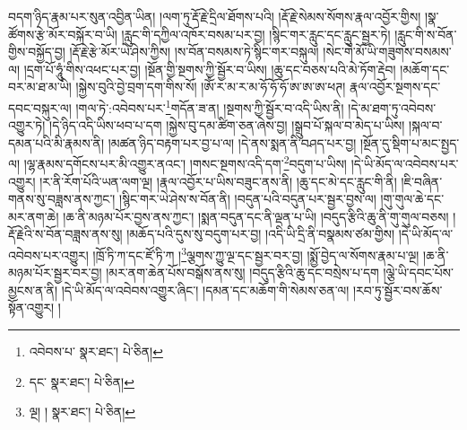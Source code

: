 བདག་ཉིད་རྣམ་པར་སུན་འབྱིན་ཡིན། །ལག་ཏུ་རྡོ་རྗེ་དྲིལ་ཐོགས་པའི། །རྡོ་རྗེ་སེམས་སོགས་རྣལ་འབྱོར་གྱིས། །སྣ་ཚོགས་རྩེ་མོར་བསྐོར་བ་ཡི། །རླུང་གི་དཀྱིལ་འཁོར་བསམ་པར་བྱ། །སྙིང་གར་རླུང་དང་རླུང་སྦྱར་ཏེ། །རླུང་གི་ས་བོན་གྱིས་བསྐྱོད་བྱ། །རྡོ་རྗེ་རྩེ་མོར་ཡེ་ཤེས་ཀྱིས། །ས་བོན་བསམས་ཏེ་སྙིང་གར་བསྐུལ། །སེང་གེ་མོ་ཡི་གཟུགས་བསམས་ལ། །དྲག་པོ་ཧཱུཾ་གིས་འཕང་པར་བྱ། །སྔོན་གྱི་སྔགས་ཀྱི་སྦྱོར་བ་ཡིས། །ཆུ་དང་བཅས་པའི་མེ་ཏོག་རྡེབ། །མཆོག་དང་བར་མ་ཐ་མ་ཡི། །སྐྱེས་བུའི་བྱེ་བྲག་དག་གིས་སོ། །ཨོཾ་ར་མ་ར་མ་ཧོ་ཧོ་ཧོ་ཨ་ཨ་ཨ་ཕཊ། རྣལ་འབྱོར་སྔགས་དང་དབང་བསྐུར་ལ། །གལ་ཏེ་:འབེབས་པར་\footnote{འབེབས་པ་  སྣར་ཐང་།  པེ་ཅིན། }གདོན་ཟ་ན། །སྔགས་ཀྱི་སྦྱོར་བ་འདི་ཡིས་ནི། །དེ་མ་ཐག་ཏུ་འབེབས་འགྱུར་ཏེ། །དེ་ཉིད་འདི་ཡིས་ཕབ་པ་དག །སྐྱེས་བུ་དམ་ཚིག་ཅན་ཞེས་བྱ། །སྒྲུབ་པོ་སྐལ་བ་མེད་པ་ཡིས། །སྐལ་བ་དམན་པའི་མི་རྣམས་ནི། །མཚན་ཉིད་བརྟག་པར་བྱ་པ་ལ། །དེ་ནས་སྨན་ནི་བཤད་པར་བྱ། །སྔོན་དུ་སྡིག་པ་མང་སྤྱད་ལ། །ལྷ་རྣམས་དགོངས་པར་མི་འགྱུར་ནའང་། །གསང་སྔགས་འདི་དག་\footnote{དང་  སྣར་ཐང་།  པེ་ཅིན། }བདུག་པ་ཡིས། །དེ་ཡི་མོད་ལ་འབེབས་པར་འགྱུར། །ར་ནི་རོག་པོའི་ཡན་ལག་ལྔ། །རྣལ་འབྱོར་པ་ཡིས་བཟུང་ནས་ནི། །ཆུ་དང་མེ་དང་རླུང་གི་ནི། །ཇི་བཞིན་གནས་སུ་བཟླས་ནས་ཀྱང་། །སྙིང་གར་ཡེ་ཤེས་ས་བོན་ནི། །བདུན་པའི་བདུན་པར་སྦྱར་བྱས་ལ། །གུ་གུལ་ཆེ་དང་མར་ནག་ཆེ། །ཆ་ནི་མཉམ་པོར་བྱས་ནས་ཀྱང་། །སྨན་བདུན་དང་ནི་ལྡན་པ་ཡི། །བདུད་རྩིའི་ཆུ་ནི་གུ་གུལ་བཅས། །རྡོ་རྗེའི་ས་བོན་བཟླས་ནས་སུ། །མཆོད་པའི་དུས་སུ་བདུག་པར་བྱ། །འདི་ཡི་དྲི་ནི་བསྣམས་ཙམ་གྱིས། །དེ་ཡི་མོད་ལ་འབེབས་པར་འགྱུར། །ཁྲོ་ཏི་ཀ་དང་ཛོ་ཏི་ཀ །\footnote{ལྔ། །  སྣར་ཐང་།  པེ་ཅིན། }ལྕགས་ཀྱུ་ལྔ་དང་སྦྱར་བར་བྱ། །སྨྱོ་བྱེད་ལ་སོགས་རྣམ་པ་ལྔ། །ཆ་ནི་མཉམ་པོར་སྦྱར་བར་བྱ། །མར་ནག་ཆེན་པོས་བསྒོས་ནས་སུ། །བདུད་རྩིའི་ཆུ་དང་བསྲེས་པ་དག །ལྕེ་ཡི་དབང་པོས་མྱངས་ན་ནི། །དེ་ཡི་མོད་ལ་འབེབས་འགྱུར་ཞིང་། །དམན་དང་མཆོག་གི་སེམས་ཅན་ལ། །རབ་ཏུ་སྦྱོར་བས་ཆོས་སྟོན་འགྱུར། །
